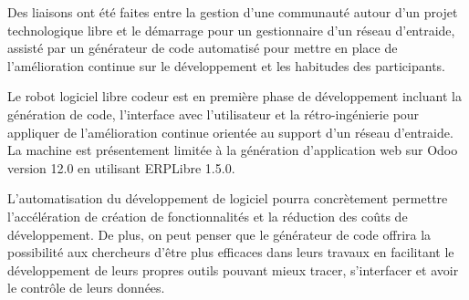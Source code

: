 Des liaisons ont été faites entre la gestion d'une communauté autour d'un projet technologique libre et le démarrage pour un gestionnaire d'un réseau d'entraide, assisté par un générateur de code automatisé pour mettre en place de l'amélioration continue sur le développement et les habitudes des participants.

Le robot logiciel libre codeur est en première phase de développement incluant la génération de code, l’interface avec l’utilisateur et la rétro-ingénierie pour appliquer de l’amélioration continue orientée au support d’un réseau d’entraide. La machine est présentement limitée à la génération d'application web sur Odoo version 12.0 en utilisant ERPLibre 1.5.0.

L’automatisation du développement de logiciel pourra concrètement permettre l’accélération de création de fonctionnalités et la réduction des coûts de développement. De plus, on peut penser que le générateur de code offrira la possibilité aux chercheurs d’être plus efficaces dans leurs travaux en facilitant le développement de leurs propres outils pouvant mieux tracer, s’interfacer et avoir le contrôle
de leurs données.




